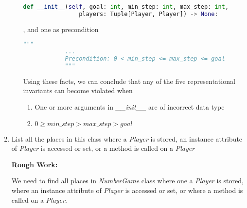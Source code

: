 \documentclass[12pt]{article}
\begin{document}
\begin{enumerate}[1.]
\begin{itemize}
\begin{mdframed}
\begin{mdframed}
            \begin{lstlisting}[language=Python]
            def __init__(self, goal: int, min_step: int, max_step: int,
                players: Tuple[Player, Player]) -> None:
            \end{lstlisting}

            \bigskip

            , and one as precondition

            \bigskip

            \begin{lstlisting}[language=Python]
            """
            ...
            Precondition: 0 < min_step <= max_step <= goal
            """
            \end{lstlisting}

            \bigskip

            Using these facts, we can conclude that any of the five
            representational invariants can become violated when

            \begin{enumerate}[1.]
                \item One or more arguments in \textit{\_\_init\_\_} are of incorrect data type
                \item $0 \geq \textit{min\_step} > \textit{max\_step} > \textit{goal}$
            \end{enumerate}

            \end{mdframed}
        \end{mdframed}

    \end{itemize}

    \item List all the places in this class where a \textit{Player} is stored, an instance
    attribute of \textit{Player} is accessed or set, or a method is called on a \textit{Player}

    \bigskip

    \begin{mdframed}
        \underline{\textbf{Rough Work:}}

        \bigskip

        We need to find all places in \textit{NumberGame} class where one a
        \textit{Player} is stored, where an instance attribute of \textit{Player}
        is accessed or set, or where a method is called on a \textit{Player}.

        \bigskip


\end{mdframed}
\end{enumerate}
\end{document}
